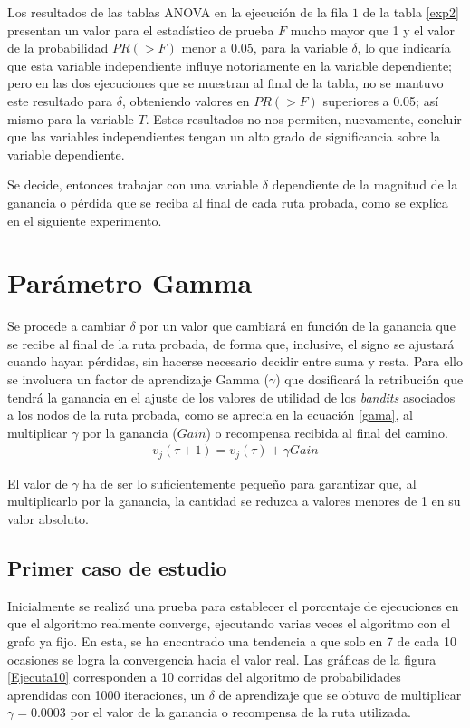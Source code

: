 Los resultados de las tablas ANOVA en la ejecución de la fila $1$ de la tabla \ref{exp2} presentan un valor para el estadístico de prueba $F$ mucho mayor que 1 y el valor de la probabilidad $PR(>F)$ menor a 0.05, para la variable $\delta$, lo que indicaría que esta variable independiente influye notoriamente en la variable dependiente; pero en las dos ejecuciones que se muestran al final de la tabla, no se mantuvo este resultado para $\delta$, obteniendo valores en $PR(>F)$ superiores a 0.05; así mismo para la variable $T$. Estos resultados no nos permiten, nuevamente, concluir que las variables independientes tengan un alto grado de significancia sobre la variable dependiente.

Se decide, entonces trabajar con una variable $\delta$ dependiente de la magnitud de la ganancia o pérdida que se reciba al final de cada ruta probada, como se explica en el siguiente experimento.

\section{Parámetro Gamma}

Se procede a cambiar $\delta$ por un valor que cambiará en función de la ganancia que se recibe al final de la ruta probada, de forma que, inclusive, el signo se ajustará cuando hayan pérdidas, sin hacerse necesario decidir entre suma y resta. Para ello se involucra un factor de aprendizaje Gamma ($\gamma$) que dosificará la retribución que tendrá la ganancia en el ajuste de los valores de utilidad de los \textit{bandits} asociados a los nodos de la ruta probada, como se aprecia en la ecuación \ref{gama}, al multiplicar $\gamma$ por la ganancia ($Gain$) o recompensa recibida al final del camino.
\begin{eqnarray}
\label{gama}
v_j(\tau + 1) = v_j(\tau) + \gamma Gain
\end{eqnarray}

El valor de $\gamma$ ha de ser lo suficientemente pequeño para garantizar que, al multiplicarlo por la ganancia, la cantidad se reduzca a valores menores de 1 en su valor absoluto.

\subsection{Primer caso de estudio}

Inicialmente se realizó una prueba para establecer el porcentaje de ejecuciones en que el algoritmo realmente converge, ejecutando varias veces el algoritmo con el grafo ya fijo. En esta, se ha encontrado una tendencia a que solo en 7 de cada 10 ocasiones se logra la convergencia hacia el valor real. Las gráficas de la figura \ref{Ejecuta10} corresponden a 10 corridas del algoritmo de probabilidades aprendidas con 1000 iteraciones, un $\delta$ de aprendizaje que se obtuvo de multiplicar $\gamma = 0.0003$ por el valor de la ganancia o recompensa de la ruta utilizada.

